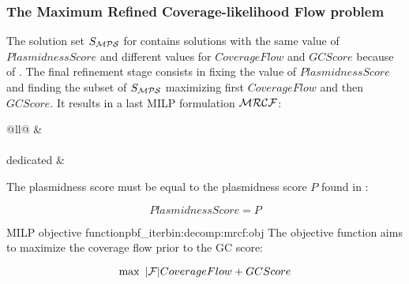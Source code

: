 \subsubsection{The Maximum Refined Coverage-likelihood Flow problem \MRCF{}}\label{sec:pbf_iterbin:decomp:mrcf}

The solution set \(S_{\mathcal{MPS}}{}\) for \MPS{} contains solutions with the same value of \(PlasmidnessScore\) and different values for \(CoverageFlow\) and \(GCScore\) because of .
The final refinement stage consists in fixing the value of \(PlasmidnessScore\) and finding the subset of \(S_{\mathcal{MPS}}{}\) maximizing first \(CoverageFlow\) and then \(GCScore\).
It results in a last MILP formulation \(\mathcal{MRCF}{}\):

\begin{table}[!htbp]
  \centering
  \label{tab:decomp:mrcf:cst}
  \begin{tabular}{@{}ll@{}}
    \toprule
     &  \\
    \midrule
     \\
    \addlinespace
    \MRCF{} dedicated &  \\
    \bottomrule
  \end{tabular}
\end{table}

The plasmidness score must be equal to the plasmidness score \(P\) found in \MPS{}:
\begin{Constraint}
  \begin{equation}
    PlasmidnessScore = P
    \label{pbf_iterbin:decomp:mrcf:cst:fix_mps_obj} %
  \end{equation}
\end{Constraint}

\begin{definition}{\MRCF{} MILP objective function}{pbf_iterbin:decomp:mrcf:obj}
  The objective function aims to maximize the coverage flow prior to the GC score:
  \begin{Objective}
    \begin{equation}
      \max ~ |\Fragments{}| CoverageFlow + GCScore
      \label{pbf_iterbin:decomp:mrcf:max_coverage_and_gc_score} %
    \end{equation}
  \end{Objective}
\end{definition}
